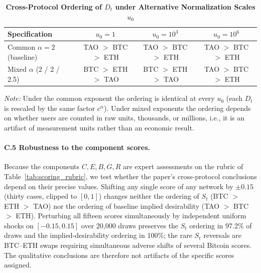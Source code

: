 \documentclass[12pt]{article}
\begin{document}
\begin{table}[H]
\centering
\caption{\textbf{Cross-Protocol Ordering of \(D_t\) under Alternative Normalization Scales \(u_0\)}}
\label{tab:rescaling}
\renewcommand{\arraystretch}{1.3}
\begin{tabular}{@{}lccc@{}}
\toprule
\rowcolor{gray!15}
\textbf{Specification} & \(u_0 = 1\) & \(u_0 = 10^3\) & \(u_0 = 10^6\) \\
\midrule
Common \(\alpha = 2\) (baseline) & TAO $>$ BTC $>$ ETH & TAO $>$ BTC $>$ ETH & TAO $>$ BTC $>$ ETH \\
Mixed \(\alpha\) (2 / 2 / 2.5)   & BTC $>$ ETH $>$ TAO & BTC $>$ ETH $>$ TAO & TAO $>$ BTC $>$ ETH \\
\bottomrule
\end{tabular}

\vspace{0.4em}
\footnotesize
\textit{Note:} Under the common exponent the ordering is identical at every \(u_0\) (each \(D_t\) is rescaled by the same factor \(c^{\alpha}\)). Under mixed exponents the ordering depends on whether users are counted in raw units, thousands, or millions, i.e., it is an artifact of measurement units rather than an economic result.

\paragraph{C.5 Robustness to the component scores.}
Because the components \( C, E, B, G, R \) are expert assessments on the rubric of Table~\ref{tab:scoring_rubric}, we test whether the paper's cross-protocol conclusions depend on their precise values. Shifting any single score of any network by \( \pm 0.15 \) (thirty cases, clipped to \([0,1]\)) changes neither the ordering of \( S_t \) (BTC $>$ ETH $>$ TAO) nor the ordering of baseline implied desirability (TAO $>$ BTC $>$ ETH). Perturbing all fifteen scores simultaneously by independent uniform shocks on \([-0.15, 0.15]\) over 20{,}000 draws preserves the \( S_t \) ordering in 97.2\% of draws and the implied-desirability ordering in 100\%; the rare \( S_t \) reversals are BTC--ETH swaps requiring simultaneous adverse shifts of several Bitcoin scores. The qualitative conclusions are therefore not artifacts of the specific scores assigned.
\end{table}
\end{document}
